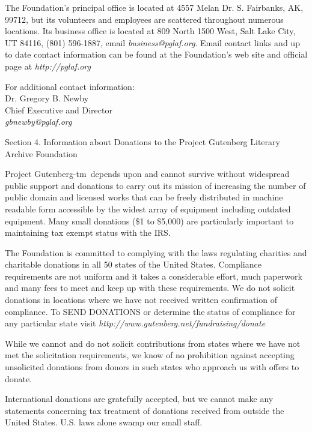 \documentclass[11pt]{book}
\newcommand{\pgtm}{Project \mbox{Gutenberg-tm}}
\begin{document}
{\smallskip\noindent The Foundation's principal office is located at 4557 Melan Dr. S.
Fairbanks, AK, 99712, but its volunteers and employees are scattered
throughout numerous locations.  Its business office is located at
809 North 1500 West, Salt Lake City, UT 84116, (801) 596-1887, email
{\em business@pglaf.org}.  Email contact links and up to date contact
information can be found at the Foundation's web site and official
page at {\em http://pglaf.org}

\smallskip\noindent For additional contact information:\\
\hspace*{3em}  Dr. Gregory B. Newby\\
\hspace*{3em}  Chief Executive and Director\\
\hspace*{3em}  {\em gbnewby@pglaf.org}

\medskip\noindent Section 4.  Information about Donations to the Project Gutenberg
Literary Archive Foundation

\smallskip\noindent \pgtm\ depends upon and cannot survive without widespread
public support and donations to carry out its mission of
increasing the number of public domain and licensed works that can be
freely distributed in machine readable form accessible by the widest
array of equipment including outdated equipment.  Many small donations
(\$1 to \$5,000) are particularly important to maintaining tax exempt
status with the IRS.

\smallskip\noindent The Foundation is committed to complying with the laws regulating
charities and charitable donations in all 50 states of the United
States.  Compliance requirements are not uniform and it takes a
considerable effort, much paperwork and many fees to meet and keep up
with these requirements.  We do not solicit donations in locations
where we have not received written confirmation of compliance.  To
SEND DONATIONS or determine the status of compliance for any
particular state visit {\em http://www.gutenberg.net/fundraising/donate}

\smallskip\noindent While we cannot and do not solicit contributions from states where we
have not met the solicitation requirements, we know of no prohibition
against accepting unsolicited donations from donors in such states who
approach us with offers to donate.

\smallskip\noindent International donations are gratefully accepted, but we cannot make
any statements concerning tax treatment of donations received from
outside the United States.  U.S. laws alone swamp our small staff.

}
\end{document}
